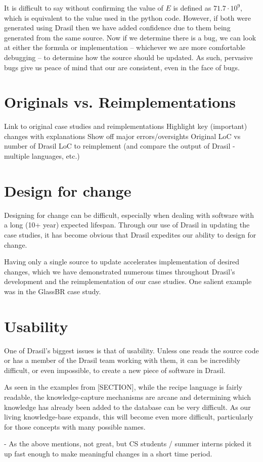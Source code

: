 It is difficult to say without confirming the value of $E$ is defined as 
$71.7\cdot{}10^{9}$, which is equivalent to the value used in the python code. 
However, if both \sfs{} were generated using Drasil then we have added 
confidence due to them being generated from the same source. Now if we 
determine there is a bug, we can look at either the formula or implementation 
-- whichever we are more comfortable debugging -- to determine how the source 
should be updated. As such, pervasive bugs give us peace of mind that our 
\sfs{} are consistent, even in the face of bugs.

\section{Originals vs. Reimplementations}
	Link to original case studies and reimplementations
	Highlight key (important) changes with explanations
	Show off major errors/oversights
	Original \sfs{} LoC vs number of Drasil LoC to reimplement (and compare the 
	output of Drasil - multiple languages, etc.)

\section{Design for change}

Designing for change can be difficult, especially when dealing with software 
with a long (10+ year) expected lifespan. Through our use of Drasil in updating 
the case studies, it has become obvious that Drasil expedites our ability to 
design for change.

Having only a single source to update accelerates implementation of desired 
changes, which we have demonstrated numerous times throughout Drasil's 
development and the reimplementation of our case studies. One salient example 
was in the GlassBR case study.

	
\section{Usability}
One of Drasil's biggest issues is that of usability. Unless one reads the source
code or has a member of the Drasil team working with them, it can be incredibly
difficult, or even impossible, to create a new piece of software in Drasil.

As seen in the examples from [SECTION], while the recipe language is fairly
readable, the knowledge-capture mechanisms are arcane and determining which
knowledge has already been added to the database can be very difficult. As our
living knowledge-base expands, this will become even more difficult,
particularly for those concepts with many possible names.

  - As the above mentions, not great, but CS students / summer interns picked it 
    up fast enough to make meaningful changes in a short time period.
